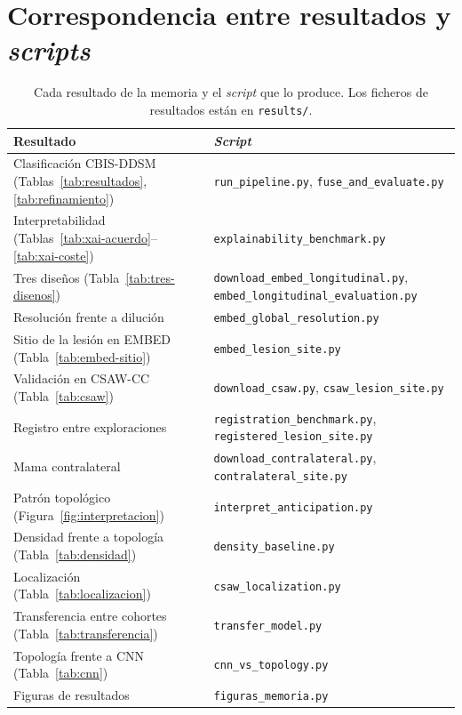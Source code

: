 \section{Correspondencia entre resultados y \textit{scripts}}
\begin{table}[H]
\centering
\caption{Cada resultado de la memoria y el \textit{script} que lo produce.
Los ficheros de resultados están en \texttt{results/}.}
\label{tab:reproducibilidad}
\small
\begin{tabular}{@{}p{5.6cm}p{8.6cm}@{}}
\toprule
\textbf{Resultado} & \textbf{\textit{Script}} \\
\midrule
Clasificación CBIS-DDSM (Tablas~\ref{tab:resultados}, \ref{tab:refinamiento}) & \texttt{run\_pipeline.py}, \texttt{fuse\_and\_evaluate.py} \\
Interpretabilidad (Tablas~\ref{tab:xai-acuerdo}--\ref{tab:xai-coste}) & \texttt{explainability\_benchmark.py} \\
Tres diseños (Tabla~\ref{tab:tres-disenos}) & \texttt{download\_embed\_longitudinal.py}, \texttt{embed\_longitudinal\_evaluation.py} \\
Resolución frente a dilución & \texttt{embed\_global\_resolution.py} \\
Sitio de la lesión en EMBED (Tabla~\ref{tab:embed-sitio}) & \texttt{embed\_lesion\_site.py} \\
Validación en CSAW-CC (Tabla~\ref{tab:csaw}) & \texttt{download\_csaw.py}, \texttt{csaw\_lesion\_site.py} \\
Registro entre exploraciones & \texttt{registration\_benchmark.py}, \texttt{registered\_lesion\_site.py} \\
Mama contralateral & \texttt{download\_contralateral.py}, \texttt{contralateral\_site.py} \\
Patrón topológico (Figura~\ref{fig:interpretacion}) & \texttt{interpret\_anticipation.py} \\
Densidad frente a topología (Tabla~\ref{tab:densidad}) & \texttt{density\_baseline.py} \\
Localización (Tabla~\ref{tab:localizacion}) & \texttt{csaw\_localization.py} \\
Transferencia entre cohortes (Tabla~\ref{tab:transferencia}) & \texttt{transfer\_model.py} \\
Topología frente a CNN (Tabla~\ref{tab:cnn}) & \texttt{cnn\_vs\_topology.py} \\
Figuras de resultados & \texttt{figuras\_memoria.py} \\
\bottomrule
\end{tabular}
\end{table}
